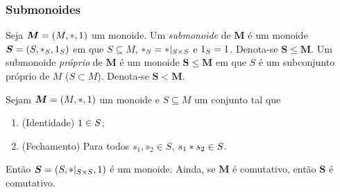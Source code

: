\subsubsection{Submonoides}

\begin{definition}
Seja $\bm M=(M,\ast,1)$ um monoide. Um \emph{submonoide} de $\bm M$ é um monoide $\bm S=(S,\ast _S,1_S)$ em que $S \subseteq M$, $\ast _S= \ast |_{S \times S}$ e $1_S=1$. Denota-se $\bm S \leq \bm M$. Um submonoide \emph{próprio} de $\bm M$ é um monoide $\bm S \leq \bm M$ em que $S$ é um subconjunto próprio de $M$ ($S \subset M$). Denota-se $\bm S < \bm M$.
\end{definition}

\begin{proposition}
\label{alge:prop.submon}
Sejam $\bm M=(M,\ast,1)$ um monoide e $S \subseteq M$ um conjunto tal que
	\begin{enumerate}[label=\textbf{SM\arabic*.},ref={SM\arabic*}]
	\item \label{SM1} (Identidade) $1 \in S$;
	\item \label{SM2} (Fechamento) Para todos $s_1,s_2 \in S$, $s_1 \ast s_2 \in S$.
	\end{enumerate}
\noindent
Então $\bm S=(S,\ast|_{S \times S},1)$ é um monoide. Ainda, se $\bm M$ é comutativo, então $\bm S$ é comutativo.
\end{proposition}
